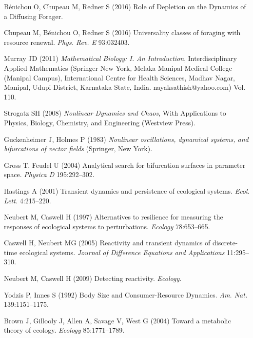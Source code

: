 \documentclass{pnastwo}
\begin{document}
\begin{article}
\begin{thebibliography}{10}
B{\'e}nichou O, Chupeau M, Redner S
\newblock (2016) {Role of Depletion on the Dynamics of a Diffusing Forager}.

Chupeau M, B{\'e}nichou O, Redner S
\newblock (2016) {Universality classes of foraging with resource renewal}.
\newblock \emph{Phys. Rev. E} 93:032403.

Murray JD
\newblock (2011) \emph{{Mathematical Biology: I. An Introduction}},
  Interdisciplinary Applied Mathematics
\newblock (Springer New York, Melaka Manipal Medical College (Manipal Campus),
  International Centre for Health Sciences, Madhav Nagar, Manipal, Udupi
  District, Karnataka State, India. nayaksathish@yahoo.com) Vol.{} 110.

Strogatz SH
\newblock (2008) \emph{{Nonlinear Dynamics and Chaos}}, With Applications to
  Physics, Biology, Chemistry, and Engineering
\newblock (Westview Press).

Guckenheimer J, Holmes P
\newblock (1983) \emph{{Nonlinear oscillations, dynamical systems, and
  bifurcations of vector fields}}
\newblock (Springer, New York).

Gross T, Feudel U
\newblock (2004) {Analytical search for bifurcation surfaces in parameter
  space}.
\newblock \emph{Physica D} 195:292--302.

Hastings A
\newblock (2001) {Transient dynamics and persistence of ecological systems}.
\newblock \emph{Ecol. Lett.} 4:215--220.

Neubert M, Caswell H
\newblock (1997) {Alternatives to resilience for measuring the responses of
  ecological systems to perturbations}.
\newblock \emph{Ecology} 78:653--665.

Caswell H, Neubert MG
\newblock (2005) {Reactivity and transient dynamics of discrete-time ecological
  systems}.
\newblock \emph{Journal of Difference Equations and Applications} 11:295--310.

Neubert M, Caswell H
\newblock (2009) {Detecting reactivity}.
\newblock \emph{Ecology}.

Yodzis P, Innes S
\newblock (1992) {Body Size and Consumer-Resource Dynamics}.
\newblock \emph{Am. Nat.} 139:1151--1175.

Brown J, Gillooly J, Allen A, Savage V, West G
\newblock (2004) {Toward a metabolic theory of ecology}.
\newblock \emph{Ecology} 85:1771--1789.


\end{thebibliography}
\end{article}
\end{document}
